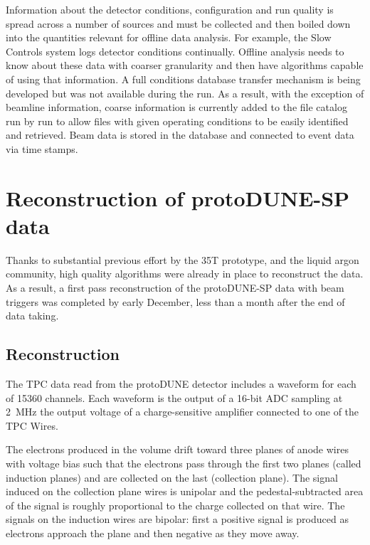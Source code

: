 Information about the detector conditions,  configuration and run quality is spread across a number of sources and must be collected and then boiled down into the quantities relevant for offline data analysis.  For example, the Slow Controls system logs detector conditions continually.  Offline analysis needs to know about these data with coarser granularity and then have algorithms capable of using that information. A full conditions database transfer mechanism is being developed but was not available during the run.  As a result, with the exception of beamline information, coarse information is currently added to the  file catalog run by run to allow files with given operating conditions to be easily identified and retrieved. Beam data is stored in the 
database and connected to event data via time stamps.

\section{Reconstruction of protoDUNE-SP data}
Thanks to substantial previous effort by the 35T prototype,  and the liquid argon community, high quality algorithms were already in place to reconstruct the data.  As a result, a first pass reconstruction of the protoDUNE-SP data with beam triggers was completed by early December, less than a month after the end of data taking.

\subsection{Reconstruction}

The TPC data read from the protoDUNE detector includes a waveform for
each of 15360 channels. Each waveform is the output of a 16-bit ADC sampling
at 2~MHz the output voltage of a charge-sensitive amplifier connected to one of
the TPC Wires. 

The electrons produced in the  volume drift %
toward three planes of anode wires with voltage bias such that the electrons
pass through the first two planes (called induction planes) and are collected
on the last (collection plane).
The signal induced on the collection plane wires is unipolar 
and the pedestal-subtracted area of the signal is roughly proportional to the
charge collected on that wire.
The signals on the induction wires are bipolar: first a positive signal is produced as
electrons approach the plane and then negative as they move away.
